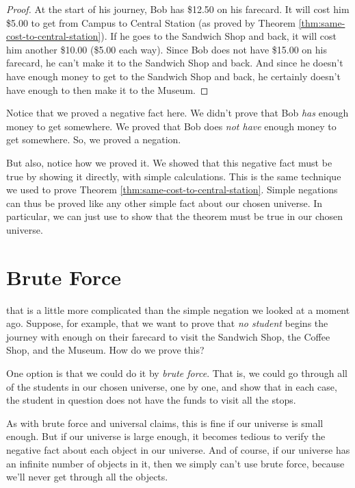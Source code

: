 \documentclass[../../../main.tex]{subfiles}
\begin{document}
\begin{framed}
  \begin{proof}
    At the start of his journey, Bob has \$12.50 on his farecard. It will cost him \$5.00 to get from Campus to Central Station (as proved by Theorem \ref{thm:same-cost-to-central-station}). If he goes to the Sandwich Shop and back, it will cost him another \$10.00 (\$5.00 each way). Since Bob does not have \$15.00 on his farecard, he can't make it to the Sandwich Shop and back. And since he doesn't have enough money to get to the Sandwich Shop and back, he certainly doesn't have enough to then make it to the Museum.
  \end{proof}
\end{framed}

Notice that we proved a negative fact here. We didn't prove that Bob \emph{has} enough money to get somewhere. We proved that Bob does \emph{not have} enough money to get somewhere. So, we proved a negation.

But also, notice how we proved it. We showed that this negative fact must be true by showing it directly, with simple calculations. This is the same technique we used to prove Theorem \ref{thm:same-cost-to-central-station}. Simple negations can thus be proved like any other simple fact about our chosen universe. In particular, we can just use  to show that the theorem must be true in our chosen universe.


\section{Brute Force}

 that is a little more complicated than the simple negation we looked at a moment ago. Suppose, for example, that we want to prove that \emph{no student} begins the journey with enough on their farecard to visit the Sandwich Shop, the Coffee Shop, and the Museum. How do we prove this?

One option is that we could do it by \emph{brute force}. That is, we could go through all of the students in our chosen universe, one by one, and show that in each case, the student in question does not have the funds to visit all the stops.

As with brute force and universal claims, this is fine if our universe is small enough. But if our universe is large enough, it becomes tedious to verify the negative fact about each object in our universe. And of course, if our universe has an infinite number of objects in it, then we simply can't use brute force, because we'll never get through all the objects.
\end{document}
